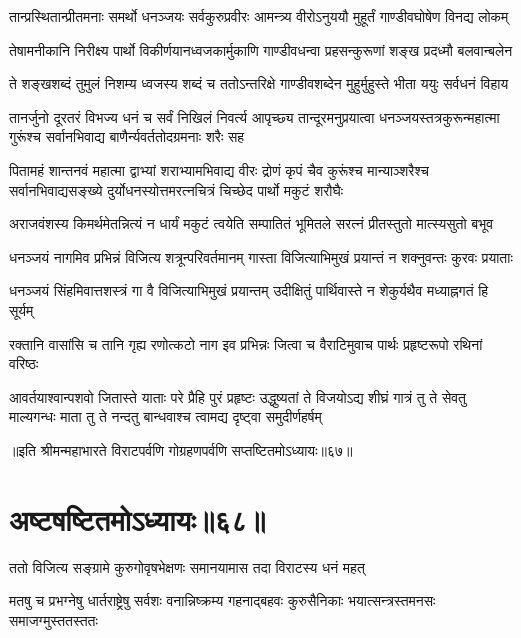 \twolineshloka
{तान्प्रस्थितान्प्रीतमनाः समर्थो धनञ्जयः सर्वकुरुप्रवीरः}
{आमन्त्र्य वीरोऽनुययौ मुहूर्तं गाण्डीवघोषेण विनद्य लोकम्}


\twolineshloka
{तेषामनीकानि निरीक्ष्य पार्थो विकीर्णयानध्वजकार्मुकाणि}
{गाण्डीवधन्वा प्रहसन्कुरूणां शङ्ख प्रदध्मौ बलवान्बलेन}


\twolineshloka
{ते शङ्खशब्दं तुमुलं निशम्य ध्वजस्य शब्दं च ततोऽन्तरिक्षे}
{गाण्डीवशब्देन मुहुर्मुहुस्ते भीता ययुः सर्वधनं विहाय}


\threelineshloka
{तानर्जुनो दूरतरं विभज्य धनं च सर्वं निखिलं निवर्त्य}
{आपृच्छ्य तान्दूरमनुप्रयात्वा धनञ्जयस्तत्रकुरून्महात्मा}
{गुरूंश्च सर्वानभिवाद्य बाणैर्न्यवर्ततोदग्रमनाः शरैः सह}


\threelineshloka
{पितामहं शान्तनवं महात्मा द्वाभ्यां शराभ्यामभिवाद्य वीरः}
{द्रोणं कृपं चैव कुरूंश्च मान्याञ्शरैश्च सर्वानभिवाद्यसङ्ख्ये}
{दुर्योधनस्योत्तमरत्नचित्रं चिच्छेद पार्थो मकुटं शरौघैः}


\twolineshloka
{अराजवंशस्य किमर्थमेतन्नित्यं न धार्यं मकुटं त्वयेति}
{सम्पातितं भूमितले सरत्नं प्रीतस्तुतो मात्स्यसुतो बभूव}


\twolineshloka
{धनञ्जयं नागमिव प्रभिन्नं विजित्य शत्रून्परिवर्तमानम्}
{गास्ता विजित्याभिमुखं प्रयान्तं न शक्नुवन्तः कुरवः प्रयाताः}


\twolineshloka
{धनञ्जयं सिंहमिवात्तशस्त्रं गा वै विजित्याभिमुखं प्रयान्तम्}
{उदीक्षितुं पार्थिवास्ते न शेकुर्यथैव मध्याह्नगतं हि सूर्यम्}


\twolineshloka
{रक्तानि वासांसि च तानि गृह्य रणोत्कटो नाग इव प्रभिन्नः}
{जित्वा च वैराटिमुवाच पार्थः प्रहृष्टरूपो रथिनां वरिष्ठः}


\threelineshloka
{आवर्तयाश्वान्पशवो जितास्ते याताः परे प्रैहि पुरं प्रहृष्टः}
{उद्धुष्यतां ते विजयोऽद्य शीघ्रं गात्रं तु ते सेवतु माल्यगन्धः}
{माता तु ते नन्दतु बान्धवाश्च त्वामद्य दृष्ट्वा समुदीर्णहर्षम्}

॥इति श्रीमन्महाभारते विराटपर्वणि गोग्रहणपर्वणि सप्तष्टितमोऽध्यायः॥६७॥

\chapter{अष्टषष्टितमोऽध्यायः॥६८॥}

\twolineshloka
{ततो विजित्य सङ्ग्रामे कुरुगोवृषभेक्षणः}
{समानयामास तदा विराटस्य धनं महत्}


\threelineshloka
{मतषु च प्रभग्नेषु धार्तराष्ट्रेषु सर्वशः}
{वनान्निष्क्रम्य गहनाद्बहवः कुरुसैनिकाः}
{भयात्सन्त्रस्तमनसः समाजग्मुस्ततस्ततः}


